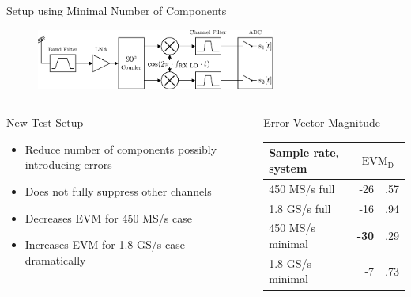 \documentclass[10pt]{beamer}
\newcommand{\mc}[2]{\multicolumn{#1}{c|}{#2}}
\begin{document}
\begin{frame}{Setup using Minimal Number of Components}
  \begin{figure}
    \centering
    \includegraphics[width=0.7\textwidth]{figures/rx_2_bd}
  \end{figure}

  \begin{columns}[T]
    \begin{column}{.5\textwidth}
      \begin{block}{New Test-Setup}
        \begin{itemize}
        \item Reduce number of components possibly introducing errors
        \item Does not fully suppress other channels
        \item Decreases EVM for 450 MS/s case
        \item Increases EVM for 1.8 GS/s case dramatically
        \end{itemize}
      \end{block}
    \end{column}
    \begin{column}{.5\textwidth}
      \begin{block}{Error Vector Magnitude}
        \begin{tabular}{|l|r@{}l|}
          \hline
          Sample rate, system             & \mc{2}{$\text{EVM}_\text{D}$} \\ \hline
          450 MS/s full                   & -26&.57      \\ \hline
          1.8 GS/s full                   & -16&.94      \\ \hline
          450 MS/s minimal                & {\bf-30}&.29 \\ \hline
          1.8 GS/s minimal                & -7&.73       \\ \hline
        \end{tabular}
      \end{block}
    \end{column}
  \end{columns}
\end{frame}
\end{document}
